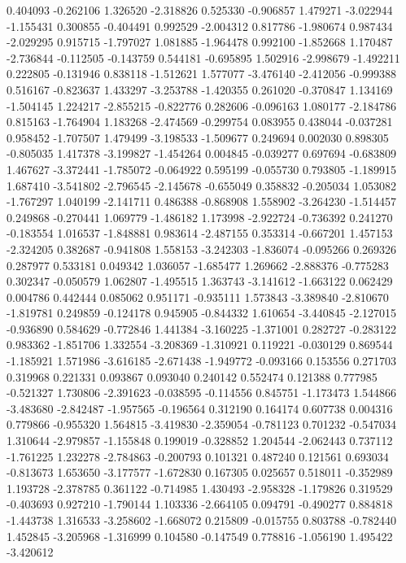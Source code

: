 0.404093
-0.262106
1.326520
-2.318826
0.525330
-0.906857
1.479271
-3.022944
-1.155431
0.300855
-0.404491
0.992529
-2.004312
0.817786
-1.980674
0.987434
-2.029295
0.915715
-1.797027
1.081885
-1.964478
0.992100
-1.852668
1.170487
-2.736844
-0.112505
-0.143759
0.544181
-0.695895
1.502916
-2.998679
-1.492211
0.222805
-0.131946
0.838118
-1.512621
1.577077
-3.476140
-2.412056
-0.999388
0.516167
-0.823637
1.433297
-3.253788
-1.420355
0.261020
-0.370847
1.134169
-1.504145
1.224217
-2.855215
-0.822776
0.282606
-0.096163
1.080177
-2.184786
0.815163
-1.764904
1.183268
-2.474569
-0.299754
0.083955
0.438044
-0.037281
0.958452
-1.707507
1.479499
-3.198533
-1.509677
0.249694
0.002030
0.898305
-0.805035
1.417378
-3.199827
-1.454264
0.004845
-0.039277
0.697694
-0.683809
1.467627
-3.372441
-1.785072
-0.064922
0.595199
-0.055730
0.793805
-1.189915
1.687410
-3.541802
-2.796545
-2.145678
-0.655049
0.358832
-0.205034
1.053082
-1.767297
1.040199
-2.141711
0.486388
-0.868908
1.558902
-3.264230
-1.514457
0.249868
-0.270441
1.069779
-1.486182
1.173998
-2.922724
-0.736392
0.241270
-0.183554
1.016537
-1.848881
0.983614
-2.487155
0.353314
-0.667201
1.457153
-2.324205
0.382687
-0.941808
1.558153
-3.242303
-1.836074
-0.095266
0.269326
0.287977
0.533181
0.049342
1.036057
-1.685477
1.269662
-2.888376
-0.775283
0.302347
-0.050579
1.062807
-1.495515
1.363743
-3.141612
-1.663122
0.062429
0.004786
0.442444
0.085062
0.951171
-0.935111
1.573843
-3.389840
-2.810670
-1.819781
0.249859
-0.124178
0.945905
-0.844332
1.610654
-3.440845
-2.127015
-0.936890
0.584629
-0.772846
1.441384
-3.160225
-1.371001
0.282727
-0.283122
0.983362
-1.851706
1.332554
-3.208369
-1.310921
0.119221
-0.030129
0.869544
-1.185921
1.571986
-3.616185
-2.671438
-1.949772
-0.093166
0.153556
0.271703
0.319968
0.221331
0.093867
0.093040
0.240142
0.552474
0.121388
0.777985
-0.521327
1.730806
-2.391623
-0.038595
-0.114556
0.845751
-1.173473
1.544866
-3.483680
-2.842487
-1.957565
-0.196564
0.312190
0.164174
0.607738
0.004316
0.779866
-0.955320
1.564815
-3.419830
-2.359054
-0.781123
0.701232
-0.547034
1.310644
-2.979857
-1.155848
0.199019
-0.328852
1.204544
-2.062443
0.737112
-1.761225
1.232278
-2.784863
-0.200793
0.101321
0.487240
0.121561
0.693034
-0.813673
1.653650
-3.177577
-1.672830
0.167305
0.025657
0.518011
-0.352989
1.193728
-2.378785
0.361122
-0.714985
1.430493
-2.958328
-1.179826
0.319529
-0.403693
0.927210
-1.790144
1.103336
-2.664105
0.094791
-0.490277
0.884818
-1.443738
1.316533
-3.258602
-1.668072
0.215809
-0.015755
0.803788
-0.782440
1.452845
-3.205968
-1.316999
0.104580
-0.147549
0.778816
-1.056190
1.495422
-3.420612
